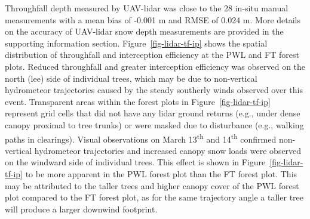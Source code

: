 \documentclass[
  letterpaper,
  DIV=11,
  numbers=noendperiod]{scrartcl}
\begin{document}
Throughfall depth measured by UAV-lidar was close to the 28 in-situ
manual measurements with a mean bias of -0.001 m and RMSE of 0.024 m.
More details on the accuracy of UAV-lidar snow depth measurements are
provided in the supporting information section.
Figure~\ref{fig-lidar-tf-ip} shows the spatial distribution of
throughfall and interception efficiency at the PWL and FT forest plots.
Reduced throughfall and greater interception efficiency was observed on
the north (lee) side of individual trees, which may be due to
non-vertical hydrometeor trajectories caused by the steady southerly
winds observed over this event. Transparent areas within the forest
plots in Figure~\ref{fig-lidar-tf-ip} represent grid cells that did not
have any lidar ground returns (e.g., under dense canopy proximal to tree
trunks) or were masked due to disturbance (e.g., walking paths in
clearings). Visual observations on March 13\textsuperscript{th} and
14\textsuperscript{th} confirmed non-vertical hydrometeor trajectories
and increased canopy snow loads were observed on the windward side of
individual trees. This effect is shown in Figure~\ref{fig-lidar-tf-ip}
to be more apparent in the PWL forest plot than the FT forest plot. This
may be attributed to the taller trees and higher canopy cover of the PWL
forest plot compared to the FT forest plot, as for the same trajectory
angle a taller tree will produce a larger downwind footprint.
\end{document}
